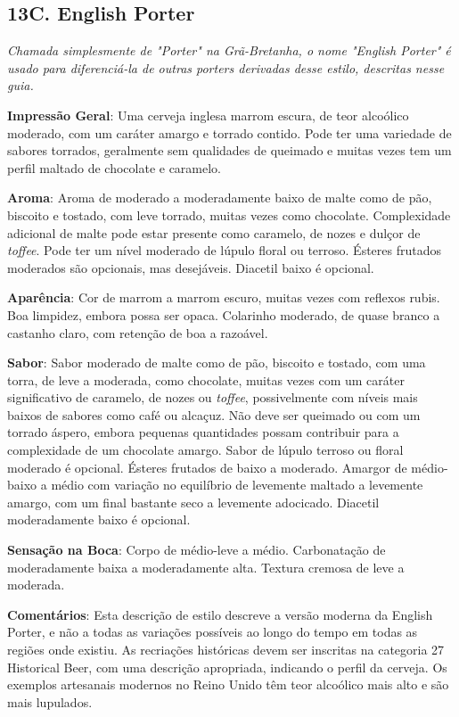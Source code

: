 \subsection*{13C. English Porter}
\textit{Chamada simplesmente de "Porter" na Grã-Bretanha, o nome "English Porter" é usado para diferenciá-la de outras porters derivadas desse estilo, descritas nesse guia.}

\textbf{Impressão Geral}: Uma cerveja inglesa marrom escura, de teor alcoólico moderado, com um caráter amargo e torrado contido. Pode ter uma variedade de sabores torrados, geralmente sem qualidades de queimado e muitas vezes tem um perfil maltado de chocolate e caramelo.

\textbf{Aroma}: Aroma de moderado a moderadamente baixo de malte como de pão, biscoito e tostado, com leve torrado, muitas vezes como chocolate. Complexidade adicional de malte pode estar presente como caramelo, de nozes e dulçor de \textit{toffee}. Pode ter um nível moderado de lúpulo floral ou terroso. Ésteres frutados moderados são opcionais, mas desejáveis. Diacetil baixo é opcional.

\textbf{Aparência}: Cor de marrom a marrom escuro, muitas vezes com reflexos rubis. Boa limpidez, embora possa ser opaca. Colarinho moderado, de quase branco a castanho claro, com retenção de boa a razoável.

\textbf{Sabor}: Sabor moderado de malte como de pão, biscoito e tostado, com uma torra, de leve a moderada, como chocolate, muitas vezes com um caráter significativo de caramelo, de nozes ou \textit{toffee}, possivelmente com níveis mais baixos de sabores como café ou alcaçuz. Não deve ser queimado ou com um torrado áspero, embora pequenas quantidades possam contribuir para a complexidade de um chocolate amargo. Sabor de lúpulo terroso ou floral moderado é opcional. Ésteres frutados de baixo a moderado. Amargor de médio-baixo a médio com variação no equilíbrio de levemente maltado a levemente amargo, com um final bastante seco a levemente adocicado. Diacetil moderadamente baixo é opcional.

\textbf{Sensação na Boca}: Corpo de médio-leve a médio. Carbonatação de moderadamente baixa a moderadamente alta. Textura cremosa de leve a moderada.

\textbf{Comentários}: Esta descrição de estilo descreve a versão moderna da English Porter, e não a todas as variações possíveis ao longo do tempo em todas as regiões onde existiu. As recriações históricas devem ser inscritas na categoria 27 Historical Beer, com uma descrição apropriada, indicando o perfil da cerveja. Os exemplos artesanais modernos no Reino Unido têm teor alcoólico mais alto e são mais lupulados.

